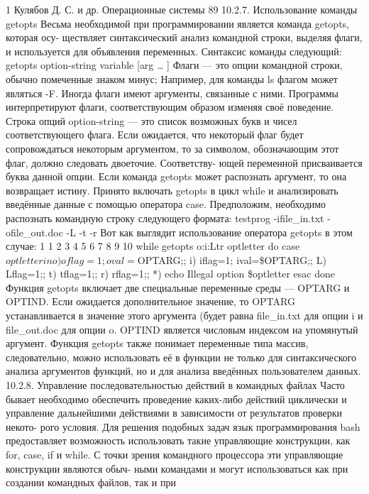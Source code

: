 \documentclass[
  letterpaper,
  DIV=11,
  numbers=noendperiod]{scrartcl}
\begin{document}
1 Кулябов Д. С. и др. Операционные системы 89 10.2.7. Использование
команды getopts Весьма необходимой при программировании является команда
getopts, которая осу- ществляет синтаксический анализ командной строки,
выделяя флаги, и используется для объявления переменных. Синтаксис
команды следующий: getopts option-string variable {[}arg \ldots{} {]}
Флаги --- это опции командной строки, обычно помеченные знаком минус;
Например, для команды ls флагом может являться -F. Иногда флаги имеют
аргументы, связанные с ними. Программы интерпретируют флаги,
соответствующим образом изменяя своё поведение. Строка опций
option-string --- это список возможных букв и чисел соответствующего
флага. Если ожидается, что некоторый флаг будет сопровождаться некоторым
аргументом, то за символом, обозначающим этот флаг, должно следовать
двоеточие. Соответству- ющей переменной присваивается буква данной
опции. Если команда getopts может распознать аргумент, то она возвращает
истину. Принято включать getopts в цикл while и анализировать введённые
данные с помощью оператора case. Предположим, необходимо распознать
командную строку следующего формата: testprog -ifile\_in.txt
-ofile\_out.doc -L -t -r Вот как выглядит использование оператора
getopts в этом случае: 1 1 2 3 4 5 6 7 8 9 10 while getopts o:i:Ltr
optletter do case \(optletter in o) oflag=1; oval=\)OPTARG;; i) iflag=1;
ival=\$OPTARG;; L) Lflag=1;; t) tflag=1;; r) rflag=1;; *) echo Illegal
option \$optletter esac done Функция getopts включает две специальные
переменные среды --- OPTARG и OPTIND. Если ожидается дополнительное
значение, то OPTARG устанавливается в значение этого аргумента (будет
равна file\_in.txt для опции i и file\_out.doc для опции o. OPTIND
является числовым индексом на упомянутый аргумент. Функция getopts также
понимает переменные типа массив, следовательно, можно использовать её в
функции не только для синтаксического анализа аргументов функций, но и
для анализа введённых пользователем данных. 10.2.8. Управление
последовательностью действий в командных файлах Часто бывает необходимо
обеспечить проведение каких-либо действий циклически и управление
дальнейшими действиями в зависимости от результатов проверки некото-
рого условия. Для решения подобных задач язык программирования bash
предоставляет возможность использовать такие управляющие конструкции,
как for, case, if и while. С точки зрения командного процессора эти
управляющие конструкции являются обыч- ными командами и могут
использоваться как при создании командных файлов, так и при
\end{document}

